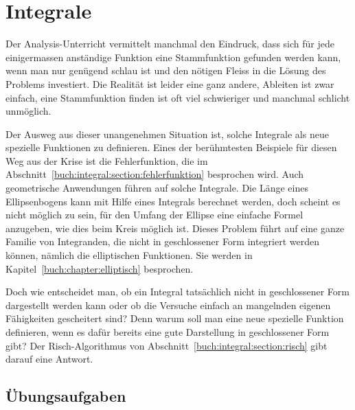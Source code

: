 %
%
%
\chapter{Integrale
\label{buch:chapter:integral}}
\rhead{}
Der Analysis-Unterricht vermittelt manchmal den Eindruck, dass sich
für jede einigermassen anständige Funktion eine Stammfunktion
gefunden werden kann, wenn man nur genügend schlau ist und den 
nötigen Fleiss in die Lösung des Problems investiert.
Die Realität ist leider eine ganz andere, Ableiten ist zwar einfach,
eine Stammfunktion finden ist oft viel schwieriger und manchmal schlicht
unmöglich.

Der Ausweg aus dieser unangenehmen Situation ist, solche Integrale
als neue spezielle Funktionen zu definieren.
Eines der berühmtesten Beispiele für diesen Weg aus der Krise ist die
Fehlerfunktion, die im Abschnitt~\ref{buch:integral:section:fehlerfunktion}
besprochen wird.
Auch geometrische Anwendungen führen auf solche Integrale.
Die Länge eines Ellipsenbogens kann mit Hilfe eines Integrals
berechnet werden, doch scheint es nicht möglich zu sein, für den
Umfang der Ellipse eine einfache Formel anzugeben, wie dies beim
Kreis möglich ist.
Dieses Problem führt auf eine ganze Familie von Integranden, die nicht in
geschlossener Form integriert werden können, nämlich die elliptischen
Funktionen.
Sie werden in Kapitel~\ref{buch:chapter:elliptisch} besprochen.

Doch wie entscheidet man, ob ein Integral tatsächlich nicht in geschlossener
Form dargestellt werden kann oder ob die Versuche einfach an mangelnden
eigenen Fähigkeiten gescheitert sind?
Denn warum soll man eine neue spezielle Funktion definieren, wenn es
dafür bereits eine gute Darstellung in geschlossener Form gibt?
Der Risch-Algorithmus von Abschnitt~\ref{buch:integral:section:risch}
gibt darauf eine Antwort.





\section*{Übungsaufgaben}
\begin{uebungsaufgaben}
\end{uebungsaufgaben}

